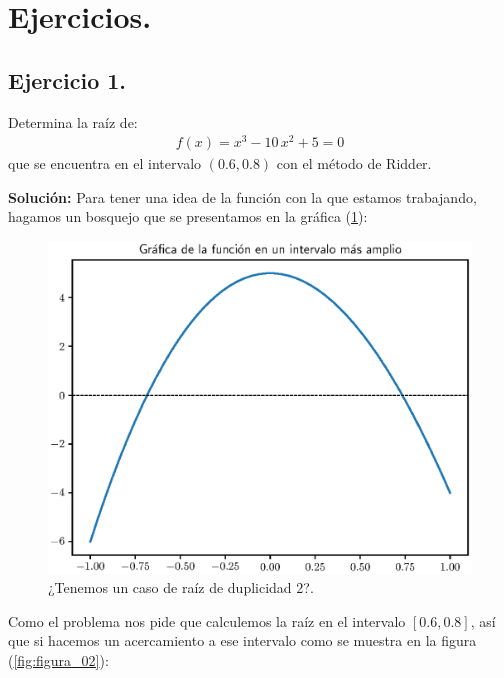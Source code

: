 \section{Ejercicios.}

\subsection{Ejercicio 1.}

Determina la raíz de:
\begin{align*}
f (x) = x^{3} - 10 \, x^{2} + 5 = 0
\end{align*}
que se encuentra en el intervalo $(0.6, 0.8)$ con el método de Ridder.
\par
\noindent
\textbf{Solución: } Para tener una idea de la función con la que estamos trabajando, hagamos un bosquejo que se presentamos en la gráfica (\ref{fig:figura_01}): 
\begin{figure}[H]
    \centering
    \includegraphics[scale=0.75]{Imagenes/plot_Metodo_Ridder_Ejercicio_01_01.eps}
    \caption{¿Tenemos un caso de raíz de duplicidad $2$?.}
    \label{fig:figura_01}
\end{figure}
Como el problema nos pide que calculemos la raíz en el intervalo $[0.6, 0.8]$, así que si hacemos un acercamiento a ese intervalo como se muestra en la figura (\ref{fig:figura_02}):
